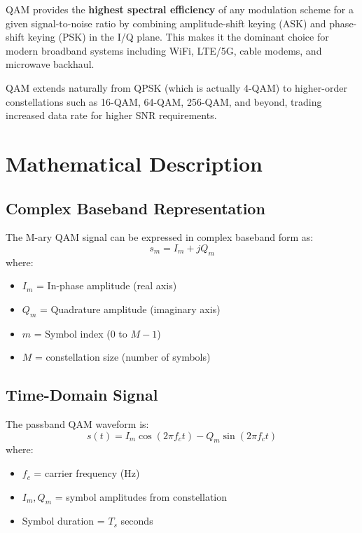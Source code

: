 \begin{keyconcept}
QAM provides the \textbf{highest spectral efficiency} of any modulation scheme for a given signal-to-noise ratio by combining amplitude-shift keying (ASK) and phase-shift keying (PSK) in the I/Q plane. This makes it the dominant choice for modern broadband systems including WiFi, LTE/5G, cable modems, and microwave backhaul.
\end{keyconcept}

QAM extends naturally from QPSK (which is actually 4-QAM) to higher-order constellations such as 16-QAM, 64-QAM, 256-QAM, and beyond, trading increased data rate for higher SNR requirements.

\section{Mathematical Description}

\subsection{Complex Baseband Representation}

The M-ary QAM signal can be expressed in complex baseband form as:
\begin{equation}
s_m = I_m + jQ_m
\label{eq:qam-baseband}
\end{equation}
where:
\begin{itemize}
\item $I_m$ = In-phase amplitude (real axis)
\item $Q_m$ = Quadrature amplitude (imaginary axis)
\item $m$ = Symbol index ($0$ to $M-1$)
\item $M$ = constellation size (number of symbols)
\end{itemize}

\subsection{Time-Domain Signal}

The passband QAM waveform is:
\begin{equation}
s(t) = I_m \cos(2\pi f_c t) - Q_m \sin(2\pi f_c t)
\label{eq:qam-passband}
\end{equation}
where:
\begin{itemize}
\item $f_c$ = carrier frequency (Hz)
\item $I_m, Q_m$ = symbol amplitudes from constellation
\item Symbol duration = $T_s$ seconds
\end{itemize}

